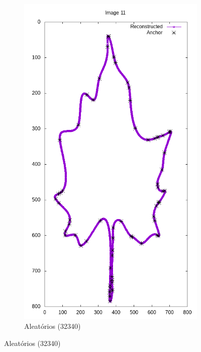 \begin{frame}
\begin{figure}[ht!]
\begin{subfigure}[t]{0.24\textwidth}
			\includegraphics[width=\textwidth]{img/rec/11rng(32340).png}
			\caption{Aleatórios (32340)}
		\end{subfigure}
		\label{fig:rec6}
	\end{figure}
\end{frame}

